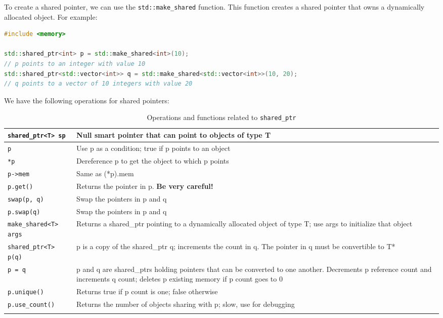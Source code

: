 To create a shared pointer, we can use the \texttt{std::make\_shared} function. This function
creates a shared pointer that owns a dynamically allocated object. For example:

\begin{lstlisting}[language=C++]
#include <memory>

std::shared_ptr<int> p = std::make_shared<int>(10); 
// p points to an integer with value 10
std::shared_ptr<std::vector<int>> q = std::make_shared<std::vector<int>>(10, 20); 
// q points to a vector of 10 integers with value 20
\end{lstlisting}

\vspace{1em}

We have the following operations for shared pointers:

\begin{longtable}{|l|p{9cm}|}
    \hline
    \texttt{shared\_ptr<T> sp} & Null smart pointer that can point to objects of type T \\ \hline
    \texttt{p} & Use p as a condition; true if p points to an object \\ \hline
    \texttt{*p} & Dereference p to get the object to which p points \\ \hline
    \texttt{p->mem} & Same as (*p).mem \\ \hline
    \texttt{p.get()} & Returns the pointer in p. \textbf{Be very careful!} \\ \hline
    \texttt{swap(p, q)} & Swap the pointers in p and q \\ \hline
    \texttt{p.swap(q)} & Swap the pointers in p and q \\ \hline
    \texttt{make\_shared<T> args} & Returns a shared\_ptr pointing to a dynamically allocated object of type T; use args to initialize that object \\ \hline
    \texttt{shared\_ptr<T> p(q)} & p is a copy of the shared\_ptr q; increments the count in q. The pointer in q must be convertible to T* \\ \hline
    \texttt{p = q} & p and q are shared\_ptrs holding pointers that can be converted to one another. Decrements p reference count and increments q count; deletes p existing memory if p count goes to 0 \\ \hline
    \texttt{p.unique()} & Returns true if p count is one; false otherwise \\ \hline
    \texttt{p.use\_count()} & Returns the number of objects sharing with p; slow, use for debugging \\ \hline
    \caption{Operations and functions related to \texttt{shared\_ptr}}
\end{longtable}

